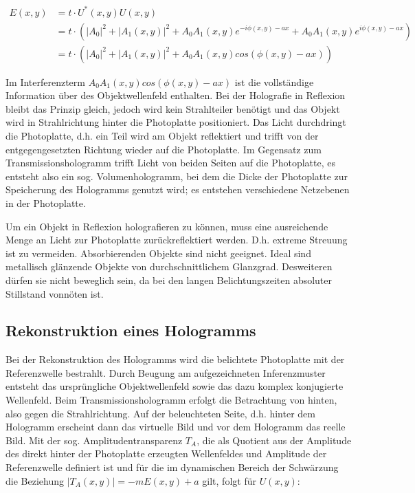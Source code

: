 \documentclass[bigchapter,colorback,accentcolor=tud4b,linedtoc,11pt]{tudreport}
\begin{document}
\begin{align*}
E(x,y) &= t \cdot U^*(x,y) U(x,y) \\
       &= t \cdot \left( |A_0|^2 + |A_1(x,y)|^2 + A_0 A_1(x,y) e^{-i \phi (x,y) -ax} + A_0 A_1(x,y) e^{i \phi (x,y) -ax} \right) \\
       &= t \cdot \left( |A_0|^2 + |A_1(x,y)|^2 + A_0 A_1(x,y) cos(\phi (x,y) -ax) \right)
\end{align*}

Im Interferenzterm $A_0 A_1(x,y) cos(\phi (x,y) -ax)$ ist die vollständige Information über des Objektwellenfeld enthalten. Bei der Holografie in Reflexion bleibt das Prinzip gleich, jedoch wird kein Strahlteiler benötigt und das Objekt wird in Strahlrichtung hinter die Photoplatte positioniert. Das Licht durchdringt die Photoplatte, d.h. ein Teil wird am Objekt reflektiert und trifft von der entgegengesetzten Richtung wieder auf die Photoplatte. Im Gegensatz zum Transmissionshologramm trifft Licht von beiden Seiten auf die Photoplatte, es entsteht also ein sog. Volumenhologramm, bei dem die Dicke der Photoplatte zur Speicherung des Hologramms genutzt wird; es entstehen verschiedene Netzebenen in der Photoplatte.

\color{blue}
Um ein Objekt in Reflexion holografieren zu können, muss eine ausreichende Menge an Licht zur Photoplatte zurückreflektiert werden. D.h. extreme Streuung ist zu vermeiden. Absorbierenden Objekte sind nicht geeignet. Ideal sind metallisch glänzende Objekte von durchschnittlichem Glanzgrad. Desweiteren dürfen sie nicht beweglich sein, da bei den langen Belichtungszeiten absoluter Stillstand vonnöten ist.
\color{black}

\subsection{Rekonstruktion eines Hologramms}

Bei der Rekonstruktion des Hologramms wird die belichtete Photoplatte mit der Referenzwelle bestrahlt. Durch Beugung am aufgezeichneten Inferenzmuster entsteht das ursprüngliche Objektwellenfeld sowie das dazu komplex konjugierte Wellenfeld. Beim Transmissionshologramm erfolgt die Betrachtung von hinten, also gegen die Strahlrichtung. Auf der beleuchteten Seite, d.h. hinter dem Hologramm erscheint dann das virtuelle Bild und vor dem Hologramm das reelle Bild. Mit der sog. Amplitudentransparenz $T_A$, die als Quotient aus der Amplitude des direkt hinter der Photoplatte erzeugten Wellenfeldes und Amplitude der Referenzwelle definiert ist und für die im dynamischen Bereich der Schwärzung die Beziehung $|T_A(x,y)| = -m E(x,y) + a$ gilt, folgt für $U(x,y)$:
\end{document}
